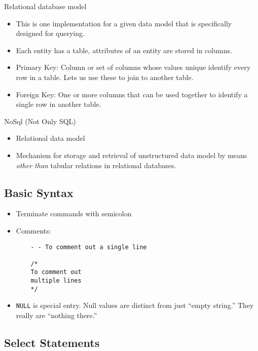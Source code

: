 \documentclass[12pt]{article}
\theoremstyle{plain}
\theoremstyle{definition}
\theoremstyle{remark}
\begin{document}
Relational database model
\begin{itemize}
  \item This is one implementation for a given data model
    that is specifically designed for querying.
  \item Each entity has a table, attributes of an entity are stored in
    columns.
  \item Primary Key:
    Column or set of columns whose values unique identify every row in a
    table.
    Lets us use these to join to another table.
  \item Foreign Key:
    One or more columns that can be used together to identify a single
    row in another table.
\end{itemize}
NoSql (Not Only SQL)
\begin{itemize}
  \item Relational data model
  \item Mechanism for storage and retrieval of unstructured
    data model by means \emph{other than} tabular relations in
    relational databases.
\end{itemize}



\clearpage
\subsection{Basic Syntax}
\begin{itemize}
  \item Terminate commands with semicolon

  \item Comments:
    \begin{lstlisting}
    - - To comment out a single line

    /*
    To comment out
    multiple lines
    */
    \end{lstlisting}

  \item \texttt{NULL} is special entry.
    Null values are distinct from just ``empty string.''
    They really are ``nothing there.''

\end{itemize}


\subsection{Select Statements}
\end{document}
